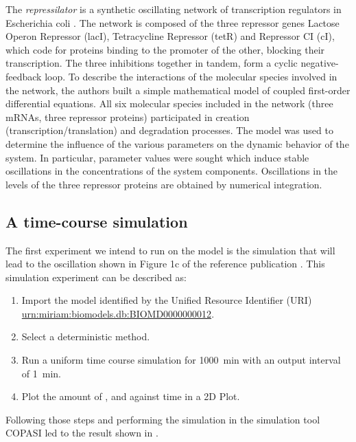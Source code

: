 The \emph{repressilator} is a synthetic oscillating network of transcription regulators in Escherichia coli \citep{Elowitz:2000}. The network is composed of the three repressor genes Lactose Operon Repressor (lacI), Tetracycline Repressor (tetR) and Repressor CI (cI), which code for proteins binding to the promoter of the other, blocking their transcription. The three inhibitions together in tandem, form a cyclic negative-feedback loop. To describe the interactions of the molecular species involved in the network, the authors built a simple mathematical model of coupled first-order differential equations. All six molecular species included in the network (three mRNAs, three repressor proteins) participated in creation (transcription/translation) and degradation processes. The model was used to determine the influence of the various parameters on the dynamic behavior of the system. In particular, parameter values were sought which induce stable oscillations in the concentrations of the system components. Oscillations in the levels of the three repressor proteins are obtained by numerical integration. 

\subsection{A time-course simulation}
 \label{sec:intro1}
 The first experiment we intend to run on the model is the simulation that will lead to the oscillation shown in Figure 1c of the reference publication \citep{Elowitz:2000}. This simulation experiment can be described as:

\begin{enumerate}
 	\item{Import the model identified by the Unified Resource Identifier (URI) \citep{Berners-Lee:2005} \url{urn:miriam:biomodels.db:BIOMD0000000012}.}
 	\item {Select a deterministic method.}
 	\item{Run a uniform time course simulation for 1000~min with an output interval of 1~min.}
 	\item{Plot the amount of ,  and  against time in a 2D Plot.}
 \end{enumerate}

Following those steps and performing the simulation in the simulation tool COPASI \citep{Hoops:2006} led to the result shown in . 

